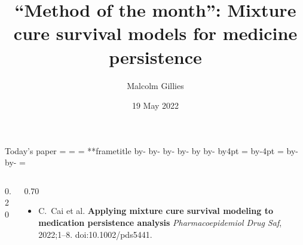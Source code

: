 \documentclass[aspectratio=169,12pt]{beamer} %
\title{``Method of the month'': Mixture cure survival models for medicine persistence}
\author{Malcolm Gillies}
\date{19 May 2022}
\makeatletter
\newif\ifsidebartheme
\newcommand*{\calculatespace}{%
    \contentheight=\paperheight%
    \ifx\beamer@frametitle\@empty%
        \setbox\@tempboxa=\box\voidb@x%
      \else%
        \setbox\@tempboxa=\vbox{%
          \vbox{}%
          {\parskip0pt\usebeamertemplate***{frametitle}}%
        }%
        \ifsidebartheme%
          \advance\contentheight by-1em%
        \fi%
      \fi%
    \advance\contentheight by-\ht\@tempboxa%
    \advance\contentheight by-\dp\@tempboxa%
    \advance\contentheight by-\beamer@frametopskip%
    \ifbeamer@plainframe%
    \contentbottom=0pt%
    \else%
    \advance\contentheight by-\headheight%
    \advance\contentheight by\headdp%
    \advance\contentheight by-\footheight%
    \advance\contentheight by4pt%
    \contentbottom=\footheight%
    \advance\contentbottom by-4pt%
    \fi%
    \contentwidth=\paperwidth%
    \ifbeamer@plainframe%
    \contentleft=0pt%
    \else%
    \advance\contentwidth by-\beamer@rightsidebar%
    \advance\contentwidth by-\beamer@leftsidebar\relax%
    \contentleft=\beamer@leftsidebar%
    \fi%
}
\makeatother
\begin{document}
{
\begin{frame}
\titlepage
\end{frame}
}

\begin{frame}{Today's paper}
\calculatespace%
\begin{columns}
\begin{column}{0.20\contentwidth}
\end{column}
\begin{column}{0.70\contentwidth}
	\begin{itemize}
		\item C.~Cai et al. \textbf{Applying mixture cure survival modeling to medication persistence analysis} \emph{Pharmacoepidemiol Drug Saf}, 2022;1--8. doi:10.1002/pds5441.
\nocite{cai_applying_2022}
\nocite{cai_smcure_2012}
\nocite{othus_cure_2012}
\nocite{flexsurvcure_2020}
	\end{itemize}
\end{column}
\end{columns}
\end{frame}
\end{document}
